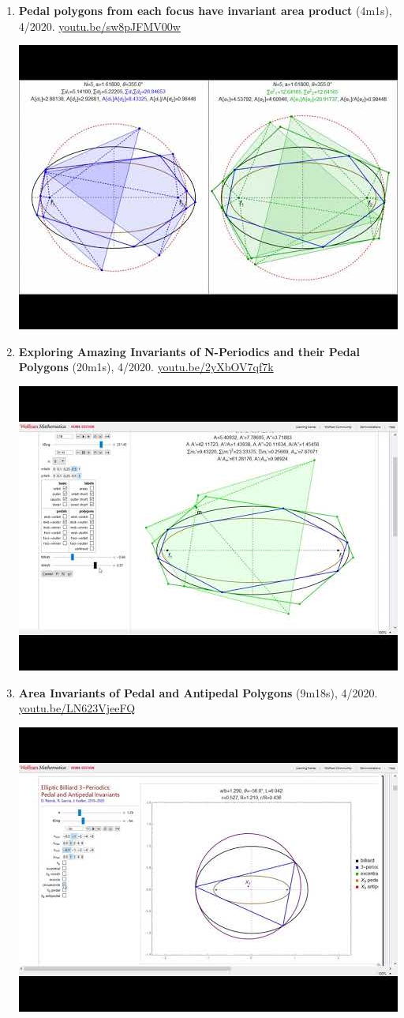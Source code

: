 \documentclass[12pt]{article}
\begin{document}
\begin{enumerate}[resume]
% 
\item \textbf{Pedal polygons from each focus have invariant area product} (4m1s), 4/2020. \href{https://youtu.be/sw8pJFMV00w}{\url{youtu.be/sw8pJFMV00w}}
\begin{center}\includegraphics[width=.5\textwidth]{pics/sw8pJFMV00w.jpg}\end{center}
% 
\item \textbf{Exploring Amazing Invariants of N-Periodics and their Pedal Polygons} (20m1s), 4/2020. \href{https://youtu.be/2yXbOV7qf7k}{\url{youtu.be/2yXbOV7qf7k}}
\begin{center}\includegraphics[width=.5\textwidth]{pics/2yXbOV7qf7k.jpg}\end{center}
% 
\item \textbf{Area Invariants of Pedal and Antipedal Polygons} (9m18s), 4/2020. \href{https://youtu.be/LN623VjeeFQ}{\url{youtu.be/LN623VjeeFQ}}
\begin{center}\includegraphics[width=.5\textwidth]{pics/LN623VjeeFQ.jpg}\end{center}

\end{enumerate}
\end{document}
